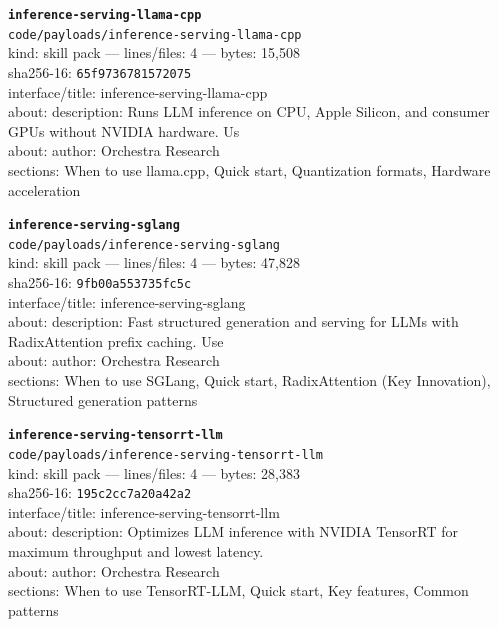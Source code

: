 \noindent\textbf{\texttt{inference-serving-llama-cpp}}\\
\texttt{code/payloads/inference-serving-llama-cpp}\\
kind: skill pack --- lines/files: 4 --- bytes: 15,508\\
sha256-16: \texttt{65f9736781572075}\\
interface/title: inference-serving-llama-cpp\\
about: description: Runs LLM inference on CPU, Apple Silicon, and consumer GPUs without NVIDIA hardware. Us\\
about: author: Orchestra Research\\
sections: When to use llama.cpp, Quick start, Quantization formats, Hardware acceleration\\
\vspace*{6.0pt}

\noindent\textbf{\texttt{inference-serving-sglang}}\\
\texttt{code/payloads/inference-serving-sglang}\\
kind: skill pack --- lines/files: 4 --- bytes: 47,828\\
sha256-16: \texttt{9fb00a553735fc5c}\\
interface/title: inference-serving-sglang\\
about: description: Fast structured generation and serving for LLMs with RadixAttention prefix caching. Use\\
about: author: Orchestra Research\\
sections: When to use SGLang, Quick start, RadixAttention (Key Innovation), Structured generation patterns\\
\vspace*{6.0pt}

\noindent\textbf{\texttt{inference-serving-tensorrt-llm}}\\
\texttt{code/payloads/inference-serving-tensorrt-llm}\\
kind: skill pack --- lines/files: 4 --- bytes: 28,383\\
sha256-16: \texttt{195c2cc7a20a42a2}\\
interface/title: inference-serving-tensorrt-llm\\
about: description: Optimizes LLM inference with NVIDIA TensorRT for maximum throughput and lowest latency.\\
about: author: Orchestra Research\\
sections: When to use TensorRT-LLM, Quick start, Key features, Common patterns\\
\vspace*{6.0pt}
\newpage

